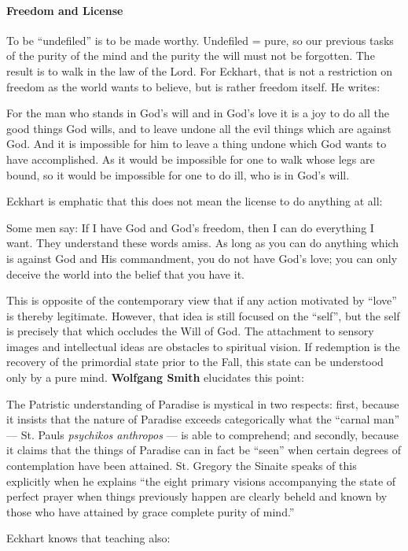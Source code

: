 \paragraph{Freedom and License}
To be “undefiled” is to be made worthy. Undefiled = pure, so our previous tasks of the purity of the mind and the purity the will must not be forgotten. The result is to walk in the law of the Lord. For Eckhart, that is not a restriction on freedom as the world wants to believe, but is rather freedom itself. He writes:

\begin{quotex}
For the man who stands in God's will and in God's love it is a joy to do all the good things God wills, and to leave undone all the evil things which are against God. And it is impossible for him to leave a thing undone which God wants to have accomplished. As it would be impossible for one to walk whose legs are bound, so it would be impossible for one to do ill, who is in God's will. 

\end{quotex}
Eckhart is emphatic that this does not mean the license to do anything at all:

\begin{quotex}
Some men say: If I have God and God's freedom, then I can do everything I want. They understand these words amiss. As long as you can do anything which is against God and His commandment, you do not have God's love; you can only deceive the world into the belief that you have it. 

\end{quotex}
This is opposite of the contemporary view that if any action motivated by “love” is thereby legitimate. However, that idea is still focused on the “self”, but the self is precisely that which occludes the Will of God. The attachment to sensory images and intellectual ideas are obstacles to spiritual vision. If redemption is the recovery of the primordial state prior to the Fall, this state can be understood only by a pure mind. \textbf{Wolfgang Smith} elucidates this point:

\begin{quotex}
The Patristic understanding of Paradise is mystical in two respects: first, because it insists that the nature of Paradise exceeds categorically what the “carnal man” — St. Pauls \emph{psychikos anthropos} — is able to comprehend; and secondly, because it claims that the things of Paradise can in fact be “seen” when certain degrees of contemplation have been attained. St. Gregory the Sinaite speaks of this explicitly when he explains “the eight primary visions accompanying the state of perfect prayer when things previously happen are clearly beheld and known by those who have attained by grace complete purity of mind.” 

\end{quotex}
Eckhart knows that teaching also:

